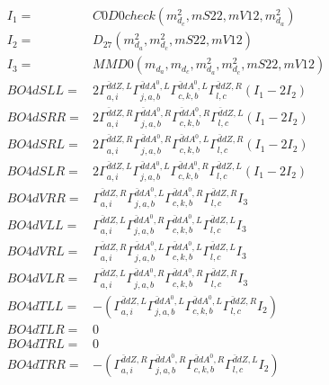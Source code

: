\documentclass[A4,landscape]{article}
\begin{document}
\begin{align} 
I_1 = & C0D0check(m^2_{d_{{c}}}, mS22, mV12, m^2_{d_{{a}}}) \\ 
I_2 = & D_{27}(m^2_{d_{{a}}}, m^2_{d_{{c}}}, mS22, mV12) \\ 
I_3 = & MMD0(m_{d_{{a}}}, m_{d_{{c}}}, m^2_{d_{{a}}}, m^2_{d_{{c}}}, mS22, mV12) \\ 
  BO4dSLL= & 2  \Gamma^{\bar{d}d Z ,L}_{a, i} \Gamma^{\bar{d}d A^0 ,L}_{j, a, b} \Gamma^{\bar{d}d A^0 ,L}_{c, k, b} \Gamma^{\bar{d}d Z ,R}_{l, c} (I_1 - 2 I_2) \\ 
  BO4dSRR= & 2  \Gamma^{\bar{d}d Z ,R}_{a, i} \Gamma^{\bar{d}d A^0 ,R}_{j, a, b} \Gamma^{\bar{d}d A^0 ,R}_{c, k, b} \Gamma^{\bar{d}d Z ,L}_{l, c} (I_1 - 2 I_2) \\ 
  BO4dSRL= & 2  \Gamma^{\bar{d}d Z ,R}_{a, i} \Gamma^{\bar{d}d A^0 ,R}_{j, a, b} \Gamma^{\bar{d}d A^0 ,L}_{c, k, b} \Gamma^{\bar{d}d Z ,R}_{l, c} (I_1 - 2 I_2) \\ 
  BO4dSLR= & 2  \Gamma^{\bar{d}d Z ,L}_{a, i} \Gamma^{\bar{d}d A^0 ,L}_{j, a, b} \Gamma^{\bar{d}d A^0 ,R}_{c, k, b} \Gamma^{\bar{d}d Z ,L}_{l, c} (I_1 - 2 I_2) \\ 
  BO4dVRR= &  \Gamma^{\bar{d}d Z ,R}_{a, i} \Gamma^{\bar{d}d A^0 ,L}_{j, a, b} \Gamma^{\bar{d}d A^0 ,R}_{c, k, b} \Gamma^{\bar{d}d Z ,R}_{l, c} I_3 \\ 
  BO4dVLL= &  \Gamma^{\bar{d}d Z ,L}_{a, i} \Gamma^{\bar{d}d A^0 ,R}_{j, a, b} \Gamma^{\bar{d}d A^0 ,L}_{c, k, b} \Gamma^{\bar{d}d Z ,L}_{l, c} I_3 \\ 
  BO4dVRL= &  \Gamma^{\bar{d}d Z ,R}_{a, i} \Gamma^{\bar{d}d A^0 ,L}_{j, a, b} \Gamma^{\bar{d}d A^0 ,L}_{c, k, b} \Gamma^{\bar{d}d Z ,L}_{l, c} I_3 \\ 
  BO4dVLR= &  \Gamma^{\bar{d}d Z ,L}_{a, i} \Gamma^{\bar{d}d A^0 ,R}_{j, a, b} \Gamma^{\bar{d}d A^0 ,R}_{c, k, b} \Gamma^{\bar{d}d Z ,R}_{l, c} I_3 \\ 
  BO4dTLL= & -( \Gamma^{\bar{d}d Z ,L}_{a, i} \Gamma^{\bar{d}d A^0 ,L}_{j, a, b} \Gamma^{\bar{d}d A^0 ,L}_{c, k, b} \Gamma^{\bar{d}d Z ,R}_{l, c} I_2) \\ 
  BO4dTLR= & 0 \\ 
  BO4dTRL= & 0 \\ 
  BO4dTRR= & -( \Gamma^{\bar{d}d Z ,R}_{a, i} \Gamma^{\bar{d}d A^0 ,R}_{j, a, b} \Gamma^{\bar{d}d A^0 ,R}_{c, k, b} \Gamma^{\bar{d}d Z ,L}_{l, c} I_2) \\ 
\end{align} 
\end{document}
